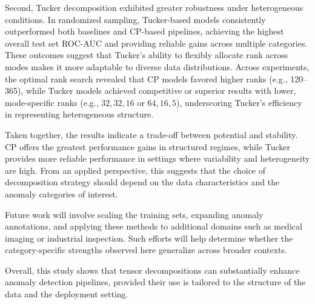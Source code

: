 \documentclass[11pt]{article}
\begin{document}
Second, Tucker decomposition exhibited greater robustness under heterogeneous conditions. In randomized sampling, Tucker-based models consistently outperformed both baselines and CP-based pipelines, achieving the highest overall test set ROC-AUC and providing reliable gains across multiple categories. These outcomes suggest that Tucker’s ability to flexibly allocate rank across modes makes it more adaptable to diverse data distributions. Across experiments, the optimal rank search revealed that CP models favored higher ranks (e.g., 120–365), while Tucker models achieved competitive or superior results with lower, mode-specific ranks (e.g., \(32,32,16\) or \(64,16,5\)), underscoring Tucker’s efficiency in representing heterogeneous structure.  

Taken together, the results indicate a trade-off between potential and stability. CP offers the greatest performance gains in structured regimes, while Tucker provides more reliable performance in settings where variability and heterogeneity are high. From an applied perspective, this suggests that the choice of decomposition strategy should depend on the data characteristics and the anomaly categories of interest.  

Future work will involve scaling the training sets, expanding anomaly annotations, and applying these methods to additional domains such as medical imaging or industrial inspection. Such efforts will help determine whether the category-specific strengths observed here generalize across broader contexts.  

Overall, this study shows that tensor decompositions can substantially enhance anomaly detection pipelines, provided their use is tailored to the structure of the data and the deployment setting.
\end{document}
